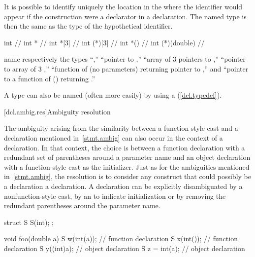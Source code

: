 It is possible to identify uniquely the location in the
where the identifier would appear if the construction were a declarator
in a declaration.
The named type is then the same as the type of the
hypothetical identifier.
\enterexample

%
%
\begin{codeblock}
int                 // 
int *               // 
int *[3]            // 
int (*)[3]          // 
int *()             // 
int (*)(double)     // 
\end{codeblock}

name respectively the types
``,''
``pointer to
,''
``array of 3 pointers to
,''
``pointer to array of 3
,''
``function of (no parameters) returning pointer to
,''
and ``pointer to a function of
()
returning
.''
\exitexample

\pnum
A type can also be named (often more easily) by using a
(\ref{dcl.typedef}).

[dcl.ambig.res]{Ambiguity resolution}%
%

\pnum
The ambiguity arising from the similarity between a function-style cast and
a declaration mentioned in~\ref{stmt.ambig} can also occur in the context of a declaration.
In that context, the choice is between a function declaration with
a redundant set of parentheses around a parameter name and an object declaration
with a function-style cast as the initializer.
Just as for the ambiguities mentioned in~\ref{stmt.ambig},
the resolution is to consider any construct that could possibly
be a declaration a declaration.
\enternote
A declaration can be explicitly disambiguated by a nonfunction-style
cast, by an
\tcode{=}
to indicate initialization or
by removing the redundant parentheses around the parameter name.
\exitnote
\enterexample

\begin{codeblock}
struct S {
  S(int);
};

void foo(double a) {
  S w(int(a));      // function declaration
  S x(int());       // function declaration
  S y((int)a);      // object declaration
  S z = int(a);     // object declaration
}
\end{codeblock}
\exitexample

